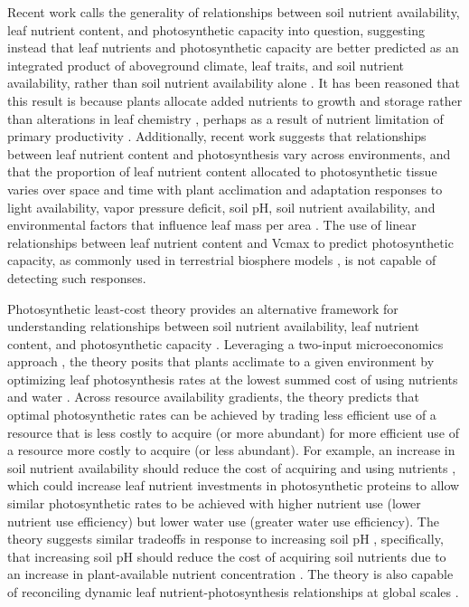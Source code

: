     Recent work calls the generality of relationships between soil nutrient availability, leaf nutrient content, and photosynthetic capacity into question, suggesting instead that leaf nutrients and photosynthetic capacity are better predicted as an integrated product of aboveground climate, leaf traits, and soil nutrient availability, rather than soil nutrient availability alone . It has been reasoned that this result is because plants allocate added nutrients to growth and storage rather than alterations in leaf chemistry , perhaps as a result of nutrient limitation of primary productivity . Additionally, recent work suggests that relationships between leaf nutrient content and photosynthesis vary across environments, and that the proportion of leaf nutrient content allocated to photosynthetic tissue varies over space and time with plant acclimation and adaptation responses to light availability, vapor pressure deficit, soil pH, soil nutrient availability, and environmental factors that influence leaf mass per area . The use of linear relationships between leaf nutrient content and Vcmax to predict photosynthetic capacity, as commonly used in terrestrial biosphere models , is not capable of detecting such responses.

    Photosynthetic least-cost theory provides an alternative framework for understanding relationships between soil nutrient availability, leaf nutrient content, and photosynthetic capacity . Leveraging a two-input microeconomics approach , the theory posits that plants acclimate to a given environment by optimizing leaf photosynthesis rates at the lowest summed cost of using nutrients and water . Across resource availability gradients, the theory predicts that optimal photosynthetic rates can be achieved by trading less efficient use of a resource that is less costly to acquire (or more abundant) for more efficient use of a resource more costly to acquire (or less abundant). For example, an increase in soil nutrient availability should reduce the cost of acquiring and using nutrients , which could increase leaf nutrient investments in photosynthetic proteins to allow similar photosynthetic rates to be achieved with higher nutrient use (lower nutrient use efficiency) but lower water use (greater water use efficiency). The theory suggests similar tradeoffs in response to increasing soil pH , specifically, that increasing soil pH should reduce the cost of acquiring soil nutrients due to an increase in plant-available nutrient concentration . The theory is also capable of reconciling dynamic leaf nutrient-photosynthesis relationships at global scales .

